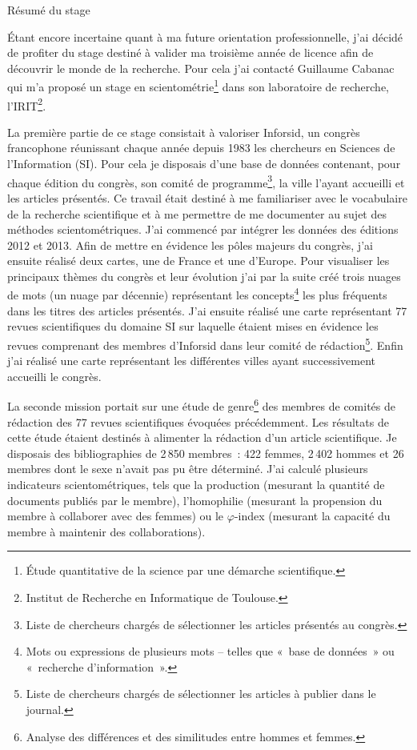 \cleardoublepage
\begingroup
	\thispagestyle{empty}
	\par\normalfont\sffamily\selectfont
	 \noindent\Large{Résumé du stage}
	\vspace*{5mm}
\endgroup
	
	Étant encore incertaine quant à ma future orientation professionnelle, j'ai décidé de profiter du stage destiné à valider ma troisième année de licence afin de découvrir le monde de la recherche. Pour cela j'ai contacté Guillaume Cabanac qui m'a proposé un stage en scientométrie\footnote{Étude quantitative de la science par une démarche scientifique.} dans son laboratoire de recherche, l'IRIT\footnote{Institut de Recherche en Informatique de Toulouse.}.
	
	
	
	La première partie de ce stage consistait à valoriser Inforsid, un congrès francophone réunissant chaque année depuis 1983 les chercheurs en Sciences de l'Information (SI). Pour cela je disposais d'une base de données contenant, pour chaque édition du congrès, son comité de programme\footnote{Liste de chercheurs chargés de sélectionner les articles présentés au congrès.}, la ville l'ayant accueilli et les articles présentés. Ce travail était destiné à me familiariser avec le vocabulaire de la recherche scientifique et à me permettre de me documenter au sujet des méthodes scientométriques. J'ai commencé par intégrer les données des éditions 2012 et 2013. Afin de mettre en évidence les pôles majeurs du congrès, j'ai ensuite réalisé deux cartes, une de France et une d'Europe. Pour visualiser les principaux thèmes du congrès et leur évolution j'ai par la suite créé trois nuages de mots (un nuage par décennie) représentant les concepts\footnote{Mots ou expressions de plusieurs mots -- telles que «~base de données~» ou «~recherche d'information~».} les plus fréquents dans les titres des articles présentés. J'ai ensuite réalisé une carte représentant 77 revues scientifiques du domaine SI  sur laquelle étaient mises en évidence les revues comprenant des membres d'Inforsid dans leur comité de rédaction\footnote{Liste de chercheurs chargés de sélectionner les articles à publier dans le journal.}. Enfin j'ai réalisé une carte représentant les différentes villes ayant successivement accueilli le congrès.
	
	
	
	La seconde mission portait sur une étude de genre\footnote{Analyse des différences et des similitudes entre hommes et femmes.} des membres de comités de rédaction des 77 revues scientifiques évoquées précédemment. Les résultats de cette étude étaient destinés à alimenter la rédaction d'un article scientifique. Je disposais des bibliographies de 2\,850 membres~: 422 femmes, 2\,402 hommes et 26 membres dont le sexe n'avait pas pu être déterminé. J'ai calculé plusieurs indicateurs scientométriques, tels que la production (mesurant la quantité de documents publiés par le membre), l'homophilie (mesurant la propension du membre à collaborer avec des femmes) ou le $\varphi$-index (mesurant la capacité du membre à maintenir des collaborations).
	
